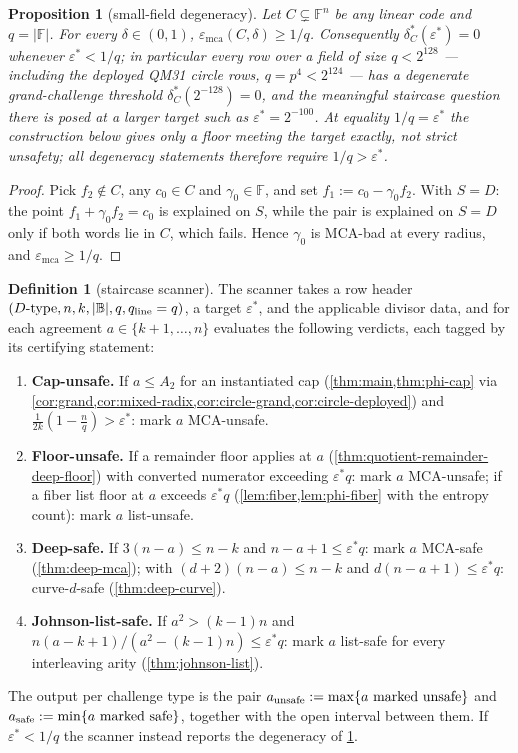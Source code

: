 \documentclass[11pt]{article}
\newtheorem{proposition}[proposition]{Proposition}
\theoremstyle{definition}
\newtheorem{definition}[definition]{Definition}
\theoremstyle{remark}
\newcommand{\F}{\mathbb{F}}
\newcommand{\B}{\mathbb{B}}
\newcommand{\emca}{\varepsilon_{\mathrm{mca}}}
\begin{document}
\begin{proposition}[small-field degeneracy]\label{prop:small-field}
Let $C\subsetneq\F^n$ be any linear code and $q=|\F|$. For every $\delta\in(0,1)$, $\emca(C,\delta)\ge1/q$. Consequently $\delta^*_C(\varepsilon^*)=0$ whenever $\varepsilon^*<1/q$; in particular every row over a field of size $q<2^{128}$ --- including the deployed QM31 circle rows, $q=p^4<2^{124}$ --- has a degenerate grand-challenge threshold $\delta^*_C(2^{-128})=0$, and the meaningful staircase question there is posed at a larger target such as $\varepsilon^*=2^{-100}$. At equality $1/q=\varepsilon^*$ the construction below gives only a floor meeting the target exactly, not strict unsafety; all degeneracy statements therefore require $1/q>\varepsilon^*$.
\end{proposition}

\begin{proof}
Pick $f_2\notin C$, any $c_0\in C$ and $\gamma_0\in\F$, and set $f_1:=c_0-\gamma_0f_2$. With $S=D$: the point $f_1+\gamma_0f_2=c_0$ is explained on $S$, while the pair is explained on $S=D$ only if both words lie in $C$, which fails. Hence $\gamma_0$ is MCA-bad at every radius, and $\emca\ge1/q$.
\end{proof}

\begin{definition}[staircase scanner]\label{def:scanner}
The scanner takes a row header $(D\text{-type},n,k,|\B|,q,q_{\rm line}=q)$, a target $\varepsilon^*$, and the applicable divisor data, and for each agreement $a\in\{k+1,\dots,n\}$ evaluates the following verdicts, each tagged by its certifying statement:
\begin{enumerate}[label=\textup{(V\arabic*)},leftmargin=2.6em]
\item \textbf{Cap-unsafe.} If $a\le A_2$ for an instantiated cap \textup(\cref{thm:main,thm:phi-cap} via \cref{cor:grand,cor:mixed-radix,cor:circle-grand,cor:circle-deployed}\textup) and $\frac1{2k}(1-\frac nq)>\varepsilon^*$: mark $a$ MCA-unsafe.
\item \textbf{Floor-unsafe.} If a remainder floor applies at $a$ \textup(\cref{thm:quotient-remainder-deep-floor}\textup) with converted numerator exceeding $\varepsilon^*q$: mark $a$ MCA-unsafe; if a fiber list floor at $a$ exceeds $\varepsilon^*q$ \textup(\cref{lem:fiber,lem:phi-fiber} with the entropy count\textup): mark $a$ list-unsafe.
\item \textbf{Deep-safe.} If $3(n-a)\le n-k$ and $n-a+1\le\varepsilon^*q$: mark $a$ MCA-safe \textup(\cref{thm:deep-mca}\textup); with $(d+2)(n-a)\le n-k$ and $d(n-a+1)\le\varepsilon^*q$: curve-$d$-safe \textup(\cref{thm:deep-curve}\textup).
\item \textbf{Johnson-list-safe.} If $a^2>(k-1)n$ and $n(a-k+1)/(a^2-(k-1)n)\le\varepsilon^*q$: mark $a$ list-safe for every interleaving arity \textup(\cref{thm:johnson-list}\textup).
\end{enumerate}
The output per challenge type is the pair $a_{\rm unsafe}:=\max\{a\ \text{marked unsafe}\}$ and $a_{\rm safe}:=\min\{a\ \text{marked safe}\}$, together with the open interval between them. If $\varepsilon^*<1/q$ the scanner instead reports the degeneracy of \cref{prop:small-field}.
\end{definition}
\end{document}
